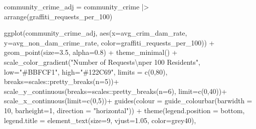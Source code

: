 \documentclass[
]{report}
\newenvironment{Shaded}{}{}
\newcommand{\AttributeTok}[1]{\textcolor[rgb]{0.65,0.15,0.64}{#1}}
\newcommand{\DecValTok}[1]{\textcolor[rgb]{0.60,0.41,0.00}{#1}}
\newcommand{\FloatTok}[1]{\textcolor[rgb]{0.60,0.41,0.00}{#1}}
\newcommand{\FunctionTok}[1]{\textcolor[rgb]{0.25,0.47,0.95}{#1}}
\newcommand{\NormalTok}[1]{\textcolor[rgb]{0.22,0.23,0.26}{#1}}
\newcommand{\OtherTok}[1]{\textcolor[rgb]{0.15,0.68,0.38}{#1}}
\newcommand{\SpecialCharTok}[1]{\textcolor[rgb]{0.00,0.52,0.74}{#1}}
\newcommand{\StringTok}[1]{\textcolor[rgb]{0.31,0.63,0.31}{#1}}
\begin{document}
\begin{Shaded}
\begin{Highlighting}[]
\NormalTok{community\_crime\_adj }\OtherTok{=}\NormalTok{ community\_crime }\SpecialCharTok{|\textgreater{}} 
  \FunctionTok{arrange}\NormalTok{(graffiti\_requests\_per\_100)}

\FunctionTok{ggplot}\NormalTok{(community\_crime\_adj, }\FunctionTok{aes}\NormalTok{(}\AttributeTok{x=}\NormalTok{avg\_crim\_dam\_rate, }\AttributeTok{y=}\NormalTok{avg\_non\_dam\_crime\_rate, }\AttributeTok{color=}\NormalTok{graffiti\_requests\_per\_100)) }\SpecialCharTok{+}
  \FunctionTok{geom\_point}\NormalTok{(}\AttributeTok{size=}\FloatTok{3.5}\NormalTok{, }\AttributeTok{alpha=}\FloatTok{0.8}\NormalTok{) }\SpecialCharTok{+}
  \FunctionTok{theme\_minimal}\NormalTok{() }\SpecialCharTok{+}
  \FunctionTok{scale\_color\_gradient}\NormalTok{(}\StringTok{"Number of Requests}\SpecialCharTok{\textbackslash{}n}\StringTok{per 100 Residents"}\NormalTok{,}
                       \AttributeTok{low=}\StringTok{"\#BBFCF1"}\NormalTok{, }\AttributeTok{high=}\StringTok{"\#122C69"}\NormalTok{,}
                       \AttributeTok{limits =} \FunctionTok{c}\NormalTok{(}\DecValTok{0}\NormalTok{,}\DecValTok{80}\NormalTok{),}
                       \AttributeTok{breaks=}\NormalTok{scales}\SpecialCharTok{::}\FunctionTok{pretty\_breaks}\NormalTok{(}\AttributeTok{n=}\DecValTok{5}\NormalTok{))}\SpecialCharTok{+}
  \FunctionTok{scale\_y\_continuous}\NormalTok{(}\AttributeTok{breaks=}\NormalTok{scales}\SpecialCharTok{::}\FunctionTok{pretty\_breaks}\NormalTok{(}\AttributeTok{n=}\DecValTok{6}\NormalTok{),}
                     \AttributeTok{limit=}\FunctionTok{c}\NormalTok{(}\DecValTok{0}\NormalTok{,}\DecValTok{40}\NormalTok{))}\SpecialCharTok{+}
  \FunctionTok{scale\_x\_continuous}\NormalTok{(}\AttributeTok{limit=}\FunctionTok{c}\NormalTok{(}\DecValTok{0}\NormalTok{,}\DecValTok{5}\NormalTok{))}\SpecialCharTok{+}
  \FunctionTok{guides}\NormalTok{(}\AttributeTok{colour =} \FunctionTok{guide\_colourbar}\NormalTok{(}\AttributeTok{barwidth =} \DecValTok{10}\NormalTok{, }\AttributeTok{barheight=}\DecValTok{1}\NormalTok{, }\AttributeTok{direction =} \StringTok{"horizontal"}\NormalTok{)) }\SpecialCharTok{+}
  \FunctionTok{theme}\NormalTok{(}\AttributeTok{legend.position =} \StringTok{\textquotesingle{}bottom\textquotesingle{}}\NormalTok{,}
        \AttributeTok{legend.title =} \FunctionTok{element\_text}\NormalTok{(}\AttributeTok{size=}\DecValTok{9}\NormalTok{, }\AttributeTok{vjust=}\FloatTok{1.05}\NormalTok{, }\AttributeTok{color=}\StringTok{\textquotesingle{}grey40\textquotesingle{}}\NormalTok{),}

\end{Highlighting}
\end{Shaded}
\end{document}
